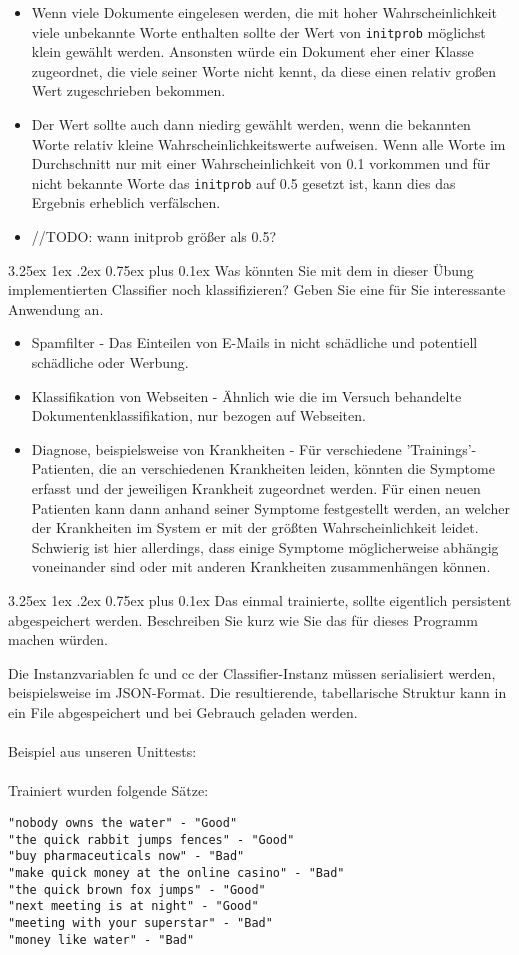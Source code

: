 \documentclass[12pt,a4paper]{scrartcl}
\makeatletter
\renewcommand\subparagraph{\@startsection{subparagraph}{5}{\parindent}%
    {3.25ex \@plus1ex \@minus .2ex}%
    {0.75ex plus 0.1ex}%
    {\normalfont\normalsize\bfseries}}
\makeatother
\begin{document}
\begin{itemize}
\item{ Wenn viele Dokumente eingelesen werden, die mit hoher Wahrscheinlichkeit viele unbekannte Worte enthalten sollte der Wert von \lstinline{initprob} m\"oglichst klein gew\"ahlt werden. Ansonsten w\"urde ein Dokument eher einer Klasse zugeordnet, die viele seiner Worte nicht kennt, da diese einen relativ gro\ss en Wert zugeschrieben bekommen. }
\item{ Der Wert sollte auch dann niedirg gew\"ahlt werden, wenn die bekannten Worte relativ kleine Wahrscheinlichkeitswerte aufweisen. Wenn alle Worte im Durchschnitt nur mit einer Wahrscheinlichkeit von 0.1 vorkommen und f\"ur nicht bekannte Worte das \lstinline{initprob} auf 0.5 gesetzt ist, kann dies das Ergebnis erheblich verf\"alschen.}
\item{ //TODO: wann initprob gr\"o\ss er als 0.5?} 
\end{itemize} 

\subparagraph{Was k\"onnten Sie mit dem in dieser \"Ubung implementierten Classifier noch klassifizieren? Geben Sie eine f\"ur Sie interessante Anwendung an.}

\begin{itemize}
\item Spamfilter - Das Einteilen von E-Mails in nicht sch\"adliche und potentiell sch\"adliche oder Werbung. 
\item Klassifikation von Webseiten - \"Ahnlich wie die im Versuch behandelte Dokumentenklassifikation, nur bezogen auf Webseiten. 
\item Diagnose, beispielsweise von Krankheiten - F\"ur verschiedene 'Trainings'-Patienten, die an verschiedenen Krankheiten leiden, k\"onnten die Symptome erfasst und der jeweiligen Krankheit zugeordnet werden. F\"ur einen neuen Patienten kann dann anhand seiner Symptome festgestellt werden, an welcher der Krankheiten im System er mit der gr\"o\ss ten Wahrscheinlichkeit leidet. Schwierig ist hier allerdings, dass einige Symptome m\"oglicherweise abh\"angig voneinander sind oder mit anderen Krankheiten zusammenh\"angen k\"onnen. 
\end{itemize}


\subparagraph{Das einmal trainierte, sollte eigentlich persistent abgespeichert werden. Beschreiben Sie kurz wie Sie das f\"ur dieses Programm machen w\"urden.}

Die Instanzvariablen fc und cc der Classifier-Instanz  m\"ussen serialisiert werden, beispielsweise im JSON-Format. Die resultierende, tabellarische Struktur kann in ein File abgespeichert und bei Gebrauch geladen werden. 
\\\\
Beispiel aus unseren Unittests:
\\\\
Trainiert wurden folgende S\"atze:
\begin{lstlisting}
"nobody owns the water" - "Good"
"the quick rabbit jumps fences" - "Good"
"buy pharmaceuticals now" -	"Bad"
"make quick money at the online casino" - "Bad"
"the quick brown fox jumps" - "Good"
"next meeting is at night" - "Good"
"meeting with your superstar" - "Bad"
"money like water" - "Bad"
\end{lstlisting}
\end{document}
